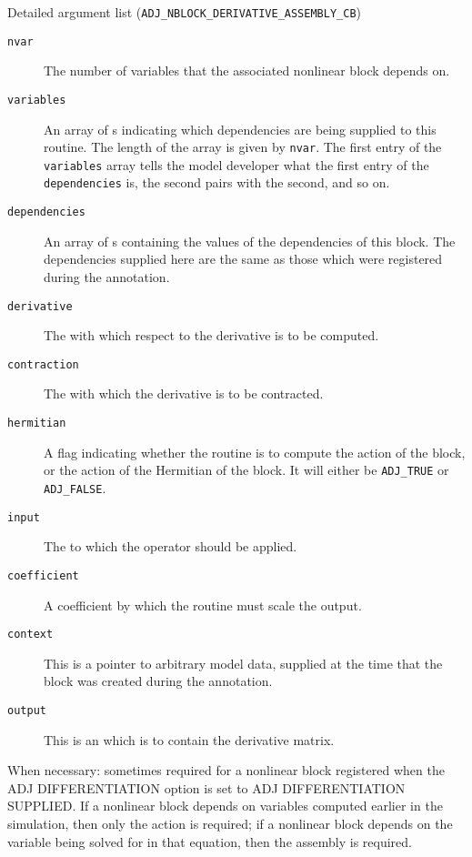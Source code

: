 \begin{boxwithtitle}{Detailed argument list (\texttt{ADJ_NBLOCK_DERIVATIVE_ASSEMBLY_CB})}
\begin{description}
\item[\texttt{nvar}] The number of variables that the associated nonlinear block depends on.
\item[\texttt{variables}] An array of s indicating which dependencies are being supplied to this routine. The length of the
array is given by \texttt{nvar}. The first entry of the \texttt{variables} array
tells the model developer what the first entry of the \texttt{dependencies} is, the second pairs with the second, and so on.
\item[\texttt{dependencies}] An array of s containing the values of the dependencies of this block. The dependencies supplied
here are the same as those which were registered during the annotation.
\item[\texttt{derivative}] The  with which respect to the derivative is to be computed.
\item[\texttt{contraction}] The  with which the derivative is to be contracted.  
\item[\texttt{hermitian}] A flag indicating whether the routine is to compute the action of the block, or the action of the Hermitian of the
block. It will either be \texttt{ADJ_TRUE} or \texttt{ADJ_FALSE}.
\item[\texttt{input}] The  to which the operator should be applied.
\item[\texttt{coefficient}] A coefficient by which the routine must scale the output.
\item[\texttt{context}] This is a pointer to arbitrary model data, supplied at the time that the block was created during the annotation.
\item[\texttt{output}] This is an  which is to contain the derivative matrix.
\end{description}
\end{boxwithtitle}

When necessary: 
sometimes required for a nonlinear block registered when the
ADJ DIFFERENTIATION option is set to ADJ DIFFERENTIATION SUPPLIED. If a nonlinear
block depends on variables computed earlier in the simulation, then only the action is
required; if a nonlinear block depends on the variable being solved for in that equation,
then the assembly is required.

